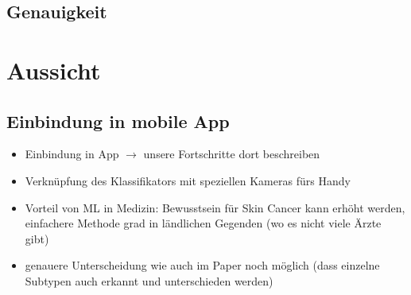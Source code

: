 \documentclass[a4paper, doc]{apa6}
\begin{document}
\subsection{Genauigkeit}

\section{Aussicht}
\subsection{Einbindung in mobile App}

\begin{itemize}
	\item Einbindung in App $\rightarrow$ unsere Fortschritte dort beschreiben
	\item Verknüpfung des Klassifikators mit speziellen Kameras fürs Handy
	\item Vorteil von ML in Medizin: Bewusstsein für Skin Cancer kann erhöht werden, einfachere Methode grad in ländlichen Gegenden (wo es nicht viele Ärzte gibt)
	\item genauere Unterscheidung wie auch im Paper noch möglich (dass einzelne Subtypen auch erkannt und unterschieden werden)
\end{itemize}




\end{document}
